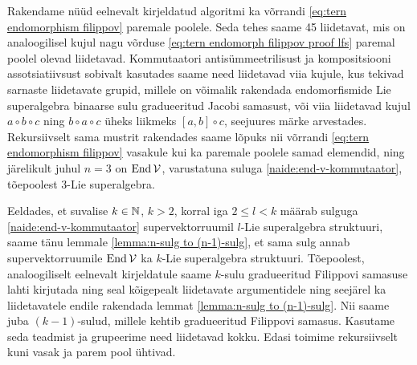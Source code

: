 Rakendame nüüd eelnevalt kirjeldatud algoritmi ka võrrandi
\eqref{eq:tern endomorphism filippov} paremale poolele. Seda tehes saame
45 liidetavat, mis on analoogilisel kujul nagu võrduse
\eqref{eq:tern endomorph filippov proof lfs} paremal poolel olevad liidetavad.
Kommutaatori antisümmeetrilisust ja kompositsiooni assotsiatiivsust sobivalt
kasutades saame need liidetavad viia kujule, kus tekivad sarnaste liidetavate
grupid, millele on võimalik rakendada endomorfismide Lie superalgebra
binaarse sulu gradueeritud Jacobi samasust, või viia liidetavad
kujul $a \circ b \circ c$ ning $b \circ a \circ c$ üheks liikmeks
$[a, b] \circ c$, seejuures märke arvestades. Rekursiivselt sama mustrit
rakendades saame lõpuks nii võrrandi \eqref{eq:tern endomorphism filippov}
vasakule kui ka paremale poolele samad elemendid, ning järelikult juhul
$n = 3$ on $\operatorname{End} \mathcal{V}$, varustatuna suluga \eqref{naide:end-v-kommutaator},
tõepoolest $3$-Lie superalgebra.

Eeldades, et suvalise $k \in \mathbb{N}$, $k > 2$, korral iga $2 \leq l < k$ määrab
sulguga \eqref{naide:end-v-kommutaator} supervektorruumil $l$-Lie
superalgebra struktuuri, saame tänu lemmale
\ref{lemma:n-sulg to (n-1)-sulg}, et sama sulg annab supervektorruumile
$\operatorname{End} \mathcal{V}$ ka $k$-Lie superalgebra struktuuri. Tõepoolest, analoogiliselt
eelnevalt kirjeldatule saame $k$-sulu gradueeritud Filippovi samasuse
lahti kirjutada ning seal kõigepealt liidetavate argumentidele ning
seejärel ka liidetavatele endile rakendada lemmat
\ref{lemma:n-sulg to (n-1)-sulg}. Nii saame juba $(k-1)$-sulud, millele
kehtib gradueeritud Filippovi samasus. Kasutame seda teadmist ja
grupeerime need liidetavad kokku. Edasi toimime rekursiivselt kuni
vasak ja parem pool ühtivad.

